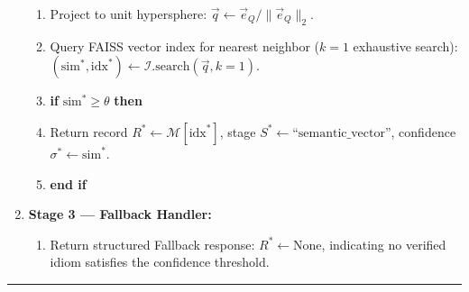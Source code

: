 \documentclass[12pt,a4paper]{article}
\begin{document}
\begin{table}[H]
\begin{minipage}{0.96\linewidth}
\begin{enumerate}
\begin{enumerate}
    \item Project to unit hypersphere: $\vec{q} \leftarrow \vec{e}_Q / \|\vec{e}_Q\|_2$.
    \item Query FAISS vector index for nearest neighbor ($k=1$ exhaustive search):\\
    $(\mathrm{sim}^*, \mathrm{idx}^*) \leftarrow \mathcal{I}.\mathrm{search}(\vec{q}, k=1)$.
    \item \textbf{if} $\mathrm{sim}^* \ge \theta$ \textbf{then}
    \item \quad Return record $R^* \leftarrow \mathcal{M}[\mathrm{idx}^*]$, stage $S^* \leftarrow \text{``semantic\_vector''}$, confidence $\sigma^* \leftarrow \mathrm{sim}^*$.
    \item \textbf{end if}
  \end{enumerate}
  \item \textbf{Stage 3 --- Fallback Handler:}
  \begin{enumerate}
    \item Return structured Fallback response: $R^* \leftarrow \mathrm{None}$, indicating no verified idiom satisfies the confidence threshold.
  \end{enumerate}
\end{enumerate}
\vspace{4pt}
\end{minipage}
\hrule height 1pt
\end{table}
\end{document}
